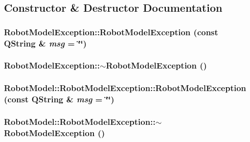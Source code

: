 \subsection{Constructor \& Destructor Documentation}
\hypertarget{class_robot_model_1_1_robot_model_exception_a0a74e3836cfe0d931c971c94f0c393fa}{
\subsubsection[{RobotModelException}]{\setlength{\rightskip}{0pt plus 5cm}RobotModelException::RobotModelException (const QString \& {\em msg} = {\ttfamily \char`\"{}\char`\"{}})}}
\label{class_robot_model_1_1_robot_model_exception_a0a74e3836cfe0d931c971c94f0c393fa}
\hypertarget{class_robot_model_1_1_robot_model_exception_a878614596085eba37b684ecb8d4dfd49}{
\subsubsection[{$\sim$RobotModelException}]{\setlength{\rightskip}{0pt plus 5cm}RobotModelException::$\sim$RobotModelException ()}}
\label{class_robot_model_1_1_robot_model_exception_a878614596085eba37b684ecb8d4dfd49}
\hypertarget{class_robot_model_1_1_robot_model_exception_a761dc06deedf762507644ba4f5bfd7ca}{
\subsubsection[{RobotModelException}]{\setlength{\rightskip}{0pt plus 5cm}RobotModel::RobotModelException::RobotModelException (const QString \& {\em msg} = {\ttfamily \char`\"{}\char`\"{}})}}
\label{class_robot_model_1_1_robot_model_exception_a761dc06deedf762507644ba4f5bfd7ca}
\hypertarget{class_robot_model_1_1_robot_model_exception_ae3df586756f02b8658c6c7234e92e9c0}{
\subsubsection[{$\sim$RobotModelException}]{\setlength{\rightskip}{0pt plus 5cm}RobotModel::RobotModelException::$\sim$RobotModelException ()}}
\label{class_robot_model_1_1_robot_model_exception_ae3df586756f02b8658c6c7234e92e9c0}


